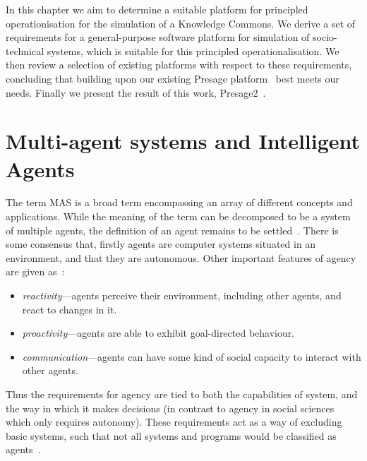 In this chapter we aim to determine a suitable platform for principled
operationisation for the simulation of a Knowledge Commons. We derive a set of
requirements for a general-purpose software platform for simulation of 
socio-technical systems, which is suitable for this principled operationalisation.
We then review a selection of existing platforms with respect to these
requirements, concluding that building upon our existing Presage
platform~\citep{Neville:2009} best meets our needs. Finally we present the
result of this work, Presage2~\citep{Macbeth2014}. %

%

\section{Multi-agent systems and Intelligent Agents}\label{sec:agents}

The term \ac{MAS} is a broad term encompassing an array of different concepts and applications. While the meaning of the term can be decomposed to be a system of multiple agents, the definition of an agent remains to be settled~\citep{Wooldridge2002}. There is some consensus that, firstly agents are computer systems situated in an environment, and that they are autonomous. Other important features of agency are given as~\citep{Wooldridge1995,HayesRoth1995}:
\begin{itemize}
\item \emph{reactivity}---agents perceive their environment, including other agents, and react to changes in it.
\item \emph{proactivity}---agents are able to exhibit goal-directed behaviour.
\item \emph{communication}---agents can have some kind of social capacity to interact with other agents.
\end{itemize}

Thus the requirements for agency are tied to both the capabilities of system, and the way in which it makes decisions (in contrast to agency in social sciences which only requires autonomy). These requirements act as a way of excluding basic systems, such that not all systems and programs would be classified as agents~\citep{Franklin1997}.

